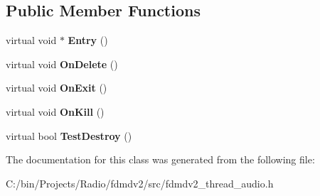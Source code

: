 \subsection*{Public Member Functions}
\begin{DoxyCompactItemize}
\item 
\hypertarget{class_fdmdv2_thread_audio_a4ff402c2338da6183124d1eacb05e839}{virtual void $\ast$ {\bfseries Entry} ()}\label{class_fdmdv2_thread_audio_a4ff402c2338da6183124d1eacb05e839}

\item 
\hypertarget{class_fdmdv2_thread_audio_aab6a2b669712e1ab88c2c288058eb11c}{virtual void {\bfseries On\-Delete} ()}\label{class_fdmdv2_thread_audio_aab6a2b669712e1ab88c2c288058eb11c}

\item 
\hypertarget{class_fdmdv2_thread_audio_ac6d4c36ce78f1065a022d212eed4cffa}{virtual void {\bfseries On\-Exit} ()}\label{class_fdmdv2_thread_audio_ac6d4c36ce78f1065a022d212eed4cffa}

\item 
\hypertarget{class_fdmdv2_thread_audio_ae33f92c6b2ce3978dc604e379c1db2ef}{virtual void {\bfseries On\-Kill} ()}\label{class_fdmdv2_thread_audio_ae33f92c6b2ce3978dc604e379c1db2ef}

\item 
\hypertarget{class_fdmdv2_thread_audio_ac57cb9d783c4fe3c96f33f6211f7a3a5}{virtual bool {\bfseries Test\-Destroy} ()}\label{class_fdmdv2_thread_audio_ac57cb9d783c4fe3c96f33f6211f7a3a5}

\end{DoxyCompactItemize}


The documentation for this class was generated from the following file\-:\begin{DoxyCompactItemize}
\item 
C\-:/bin/\-Projects/\-Radio/fdmdv2/src/fdmdv2\-\_\-thread\-\_\-audio.\-h\end{DoxyCompactItemize}
